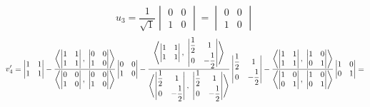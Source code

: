 \documentclass[12pt]{article}
\begin{document}
\[u_{3} = \dfrac{1}{\sqrt{1}}\begin{vmatrix} 0&0 \\ 1&0 \end{vmatrix} = \begin{vmatrix} 0&0 \\ 1&0 \end{vmatrix}\]
\[v_{4}' = \begin{vmatrix} 1&1 \\ 1&1 \end{vmatrix} - \dfrac{\left\langle\begin{vmatrix} 1&1 \\ 1&1 \end{vmatrix},\;\begin{vmatrix} 0&0 \\ 1&0 \end{vmatrix}\right\rangle}{\left\langle\begin{vmatrix} 0&0 \\ 1&0 \end{vmatrix},\;\begin{vmatrix} 0&0 \\ 1&0 \end{vmatrix}\right\rangle}\begin{vmatrix} 0&0 \\ 1&0 \end{vmatrix} - \dfrac{\left\langle\begin{vmatrix} 1&1 \\ 1&1 \end{vmatrix},\;\begin{vmatrix} \dfrac{1}{2}&1 \\ 0&-\dfrac{1}{2} \end{vmatrix}\right\rangle}{\left\langle\begin{vmatrix} \dfrac{1}{2}&1 \\ 0&-\dfrac{1}{2} \end{vmatrix},\;\begin{vmatrix} \dfrac{1}{2}&1 \\ 0&-\dfrac{1}{2} \end{vmatrix}\right\rangle}\begin{vmatrix} \dfrac{1}{2}&1 \\ 0&-\dfrac{1}{2} \end{vmatrix} - \dfrac{\left\langle\begin{vmatrix} 1&1 \\ 1&1 \end{vmatrix},\;\begin{vmatrix} 1&0 \\ 0&1 \end{vmatrix}\right\rangle}{\left\langle\begin{vmatrix} 1&0 \\ 0&1 \end{vmatrix},\;\begin{vmatrix} 1&0 \\ 0&1 \end{vmatrix}\right\rangle}\begin{vmatrix} 1&0 \\ 0&1 \end{vmatrix} =\]
\end{document}
